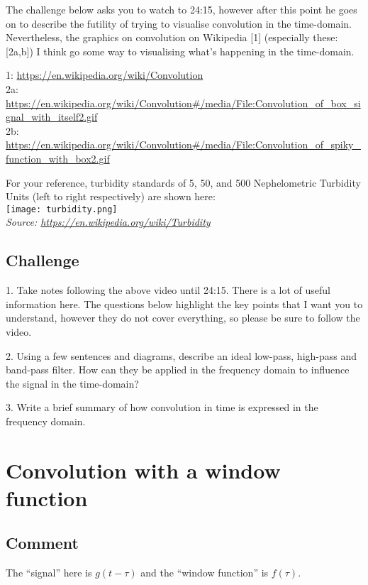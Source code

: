 The challenge below asks you to watch to 24:15, however after this point he goes on to describe the futility of trying to visualise convolution in the time-domain. Nevertheless, the graphics on convolution on Wikipedia [1] (especially these: [2a,b]) I think go some way to visualising what's happening in the time-domain.

1: \url{https://en.wikipedia.org/wiki/Convolution}\\
2a: \url{https://en.wikipedia.org/wiki/Convolution\#/media/File:Convolution_of_box_signal_with_itself2.gif}\\
2b: \url{https://en.wikipedia.org/wiki/Convolution\#/media/File:Convolution_of_spiky_function_with_box2.gif}

For your reference, turbidity standards of 5, 50, and 500 Nephelometric Turbidity Units (left to right respectively) are shown here:\\
\texttt{[image: turbidity.png]}\\
\emph{Source: \url{https://en.wikipedia.org/wiki/Turbidity}}

\subsection*{Challenge}
1. Take notes following the above video until 24:15. There is a lot of useful information here. The questions below highlight the key points that I want you to understand, however they do not cover everything, so please be sure to follow the video.

2. Using a few sentences and diagrams, describe an ideal low-pass, high-pass and band-pass filter. How can they be applied in the frequency domain to influence the signal in the time-domain?

3. Write a brief summary of how convolution in time is expressed in the frequency domain.




\newpage
\section{Convolution with a window function}

\subsection*{Comment}
The ``signal'' here is $g(t-\tau)$ and the ``window function'' is $f(\tau)$.

